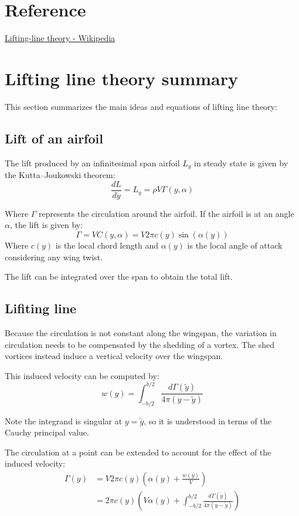 \section{Reference}
\href{https://en.wikipedia.org/wiki/Lifting-line_theory}{Lifting-line theory - Wikipedia}

\section{Lifting line theory summary}
This section summarizes the main ideas and equations of lifting line theory:

\subsection{Lift of an airfoil}
The lift produced by an infinitesimal span airfoil $L_y$ in steady state is given by the Kutta–Joukowski theorem: 
\begin{equation}
    \frac{dL}{dy} = L_y = \rho V \Gamma(y, \alpha)
\end{equation}

Where $\Gamma$ represents the circulation around the airfoil. If the airfoil is at an angle $\alpha$, the lift is given by:
\begin{equation}
    \Gamma = V C(y,\alpha) = V 2 \pi c(y) \sin(\alpha(y))
\end{equation}
Where $c(y)$ is the local chord length and $\alpha(y)$ is the local angle of attack considering any wing twist.

The lift can be integrated over the span to obtain the total lift.

\subsection{Lifiting line}
Because the circulation is not constant along the wingspan, the variation in circulation needs to be compensated by the shedding of a vortex. The shed vortices instead induce a vertical velocity over the wingspan.

This induced velocity can be computed by:
\begin{equation}
    w(y) = \int_{-b/2}^{b/2} \frac{d\Gamma(\tilde{y})}{4\pi\left(y - \tilde{y}\right)}
\end{equation}

Note the integrand is singular at $y = \tilde{y}$, so it is understood in terms of the Cauchy principal value.

The circulation at a point can be extended to account for the effect of the induced velocity:
\begin{align}
    \Gamma(y)   &= V 2 \pi c(y)  \left( \alpha(y) + \frac{w(y)}{V}\right) \\
                &= 2 \pi c(y) \left( V \alpha(y) + \int_{-b/2}^{b/2} \frac{d\Gamma(\tilde{y})}{4\pi\left(y - \tilde{y}\right)} \right)
\end{align}

